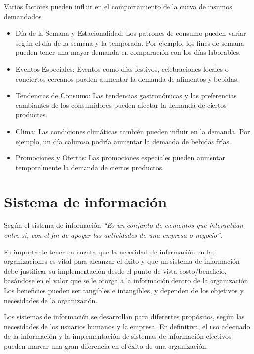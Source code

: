 Varios factores pueden influir en el comportamiento de la curva de insumos demandados:

\begin{itemize}
    \item Día de la Semana y Estacionalidad: Los patrones de consumo pueden variar según el día de la semana y la temporada. Por ejemplo, los fines de semana pueden tener una mayor demanda en comparación con los días laborables.
    
    \item Eventos Especiales: Eventos como días festivos, celebraciones locales o conciertos cercanos pueden aumentar la demanda de alimentos y bebidas.
    
    \item Tendencias de Consumo: Las tendencias gastronómicas y las preferencias cambiantes de los consumidores pueden afectar la demanda de ciertos productos.
    
    \item Clima: Las condiciones climáticas también pueden influir en la demanda. Por ejemplo, un día caluroso podría aumentar la demanda de bebidas frías.
    
    \item Promociones y Ofertas: Las promociones especiales pueden aumentar temporalmente la demanda de ciertos productos.
\end{itemize}

\section{Sistema de información }

Según\cite{kendall2005analisis} el sistema de información\textit{ “Es un conjunto de elementos que interactúan entre sí, con el fin de apoyar las actividades de una empresa o negocio”}.

Es importante tener en cuenta que la necesidad de información en las organizaciones es vital para alcanzar el éxito y que un sistema de información debe justificar su implementación desde el punto de vista costo/beneficio, basándose en el valor que se le otorga a la información dentro de la organización. Los beneficios pueden ser tangibles e intangibles, y dependen de los objetivos y necesidades de la organización.

Los sistemas de información se desarrollan para diferentes propósitos, según las necesidades de los usuarios humanos y la empresa. En definitiva, el uso adecuado de la información y la implementación de sistemas de información efectivos pueden marcar una gran diferencia en el éxito de una organización.

